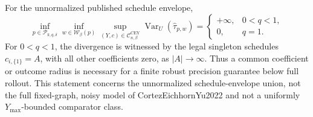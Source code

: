 For the unnormalized published schedule envelope,
\[
\inf_{p\in\mathcal P_{k,q,\delta}}
\inf_{w\in\mathcal W_\beta(p)}
\sup_{(Y,c)\in\mathcal C^{\mathrm{CEY}}_{n,\beta}}
\operatorname{Var}_U(\widehat\tau_{p,w})
=
\begin{cases}
+\infty,&0<q<1,\\
0,&q=1.
\end{cases}
\]
For \(0<q<1\), the divergence is witnessed by the legal singleton schedules \(c_{i,\{1\}}=A\), with all other coefficients zero, as \(|A|\to\infty\).  Thus a common coefficient or outcome radius is necessary for a finite robust precision guarantee below full rollout.  This statement concerns the unnormalized schedule-envelope union, not the full fixed-graph, noisy model of CortezEichhornYu2022 and not a uniformly \(Y_{\max}\)-bounded comparator class.